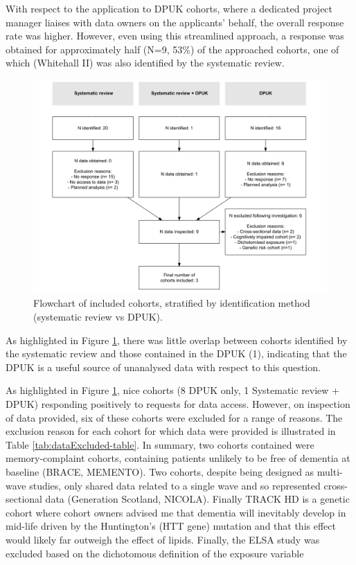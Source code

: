 \documentclass[a4paper, twoside]{templates/ociamthesis}
\begin{document}
With respect to the application to DPUK cohorts, where a dedicated project manager liaises with data owners on the applicants' behalf, the overall response rate was higher. However, even using this streamlined approach, a response was obtained for approximately half (N=9, 53\%) of the approached cohorts, one of which (Whitehall II) was also identified by the systematic review.





\begin{figure}[H]
\includegraphics[width=1\linewidth]{figures/ipd/cohortFlowchart} \caption[Flowchart]{Flowchart of included cohorts, stratified by identification method (systematic review vs DPUK).}\label{fig:cohortFlowchart}
\end{figure}

As highlighted in Figure \ref{fig:cohortFlowchart}, there was little overlap between cohorts identified by the systematic review and those contained in the DPUK (1), indicating that the DPUK is a useful source of unanalysed data with respect to this question.

As highlighted in Figure \ref{fig:cohortFlowchart}, nice cohorts (8 DPUK only, 1 Systematic review + DPUK) responding positively to requests for data access. However, on inspection of data provided, six of these cohorts were excluded for a range of reasons. The exclusion reason for each cohort for which data were provided is illustrated in Table \ref{tab:dataExcluded-table}. In summary, two cohorts contained were memory-complaint cohorts, containing patients unlikely to be free of dementia at baseline (BRACE, MEMENTO). Two cohorts, despite being designed as multi-wave studies, only shared data related to a single wave and so represented cross-sectional data (Generation Scotland, NICOLA). Finally TRACK HD is a genetic cohort where cohort owners advised me that dementia will inevitably develop in mid-life driven by the Huntington's (HTT gene) mutation and that this effect would likely far outweigh the effect of lipids. Finally, the ELSA study was excluded based on the dichotomous definition of the exposure variable
\end{document}
